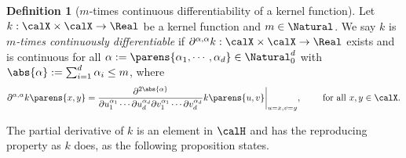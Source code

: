 \documentclass[12pt]{article}
\theoremstyle{definition}
\newtheorem{definition}{Definition}
\theoremstyle{theorem}
\theoremstyle{remark}
\newtheorem{remark}{Remark}
\begin{document}
\begin{definition}[$m$-times continuous differentiability of a kernel function]
	Let $k: \calX \times \calX \to \Real$ be a kernel function and $m \in \Natural$. We say $k$ is \textit{$m$-times continuously differentiable} if $\partial^{\alpha, \alpha}k: \calX \times \calX \to \Real$ exists and is continuous for all $\alpha := \parens{\alpha_1, \cdots, \alpha_d} \in \Natural_0^d$ with $\abs{\alpha} := \sum_{i=1}^d \alpha_i \le m$, where 
	\begin{align*}
		\partial^{\alpha, \alpha} k \parens{x, y} 
		= \frac{\partial^{2\abs{\alpha}}}{\partial u_1^{\alpha_1} \cdots \partial u_d^{\alpha_d} \partial v_1^{\alpha_1} \cdots \partial v_d^{\alpha_d}} k \parens{u, v}\bigg\vert_{u=x, v=y}, \qquad \text{ for all } x, y \in \calX. 
	\end{align*}
\end{definition}


The partial derivative of $k$ is an element in $\calH$ and has the reproducing property as $k$ does, as the following proposition states. 
\end{document}
